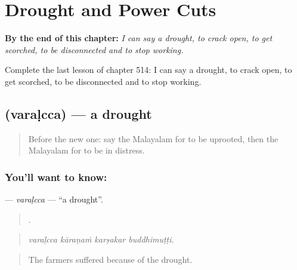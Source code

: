 
\chapter{Drought and Power Cuts}
\label{ch:ml-drought-and-power-cuts}

\begin{chapteropening}
\textbf{By the end of this chapter:} \emph{I can say a drought, to crack open, to get scorched, to be disconnected and to stop working.}

Complete the last lesson of chapter 514: I can say a drought, to crack open, to get scorched, to be disconnected and to stop working.
\end{chapteropening}

\section[\texorpdfstring{\ml{വരൾച്ച} (varaḷcca)}{വരൾച്ച (varaḷcca)}]{ (varaḷcca) — a drought}

\label{lesson:ML-C514-varalcca}



\begin{quote}
Before the new one: say the Malayalam for to be uprooted, then the Malayalam for to be in distress.
\end{quote}

\subsection*{You'll want to know: }
\textbf{} — \emph{varaḷcca} — \textquotedblleft{}a drought\textquotedblright{}.

\begin{quote}
   .
\end{quote}

\begin{quote}
\emph{varaḷcca kāraṇaṁ karṣakar buddhimuṭṭi.}
\end{quote}

\begin{quote}
The farmers suffered because of the drought.
\end{quote}

